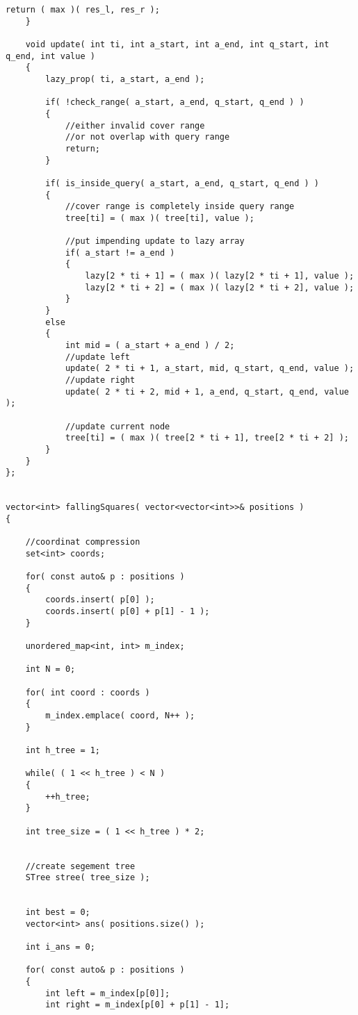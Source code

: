 \begin{lstlisting}[style=customc, caption={Segment Tree}]
        return ( max )( res_l, res_r );
    }

    void update( int ti, int a_start, int a_end, int q_start, int q_end, int value )
    {
        lazy_prop( ti, a_start, a_end );

        if( !check_range( a_start, a_end, q_start, q_end ) )
        {
            //either invalid cover range
            //or not overlap with query range
            return;
        }

        if( is_inside_query( a_start, a_end, q_start, q_end ) )
        {
            //cover range is completely inside query range
            tree[ti] = ( max )( tree[ti], value );

            //put impending update to lazy array
            if( a_start != a_end )
            {
                lazy[2 * ti + 1] = ( max )( lazy[2 * ti + 1], value );
                lazy[2 * ti + 2] = ( max )( lazy[2 * ti + 2], value );
            }
        }
        else
        {
            int mid = ( a_start + a_end ) / 2;
            //update left
            update( 2 * ti + 1, a_start, mid, q_start, q_end, value );
            //update right
            update( 2 * ti + 2, mid + 1, a_end, q_start, q_end, value );

            //update current node
            tree[ti] = ( max )( tree[2 * ti + 1], tree[2 * ti + 2] );
        }
    }
};


vector<int> fallingSquares( vector<vector<int>>& positions )
{

    //coordinat compression
    set<int> coords;

    for( const auto& p : positions )
    {
        coords.insert( p[0] );
        coords.insert( p[0] + p[1] - 1 );
    }

    unordered_map<int, int> m_index;

    int N = 0;

    for( int coord : coords )
    {
        m_index.emplace( coord, N++ );
    }

    int h_tree = 1;

    while( ( 1 << h_tree ) < N )
    {
        ++h_tree;
    }

    int tree_size = ( 1 << h_tree ) * 2;


    //create segement tree
    STree stree( tree_size );


    int best = 0;
    vector<int> ans( positions.size() );

    int i_ans = 0;

    for( const auto& p : positions )
    {
        int left = m_index[p[0]];
        int right = m_index[p[0] + p[1] - 1];


\end{lstlisting}
